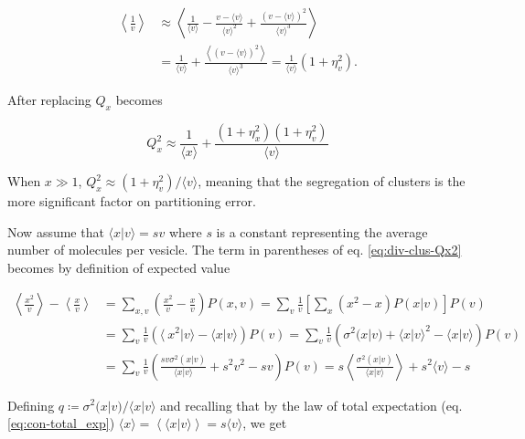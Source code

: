 \begin{equation*}
  \begin{split}
    \left\langle\frac{1}{v}\right\rangle &\approx \left\langle \frac{1}{\langle v\rangle} - \frac{v-\langle v\rangle}{\langle v\rangle^2} + \frac{(v-\langle v\rangle)^2}{\langle v\rangle^3}\right\rangle\\
    &=\frac{1}{\langle v\rangle} + \frac{\left\langle(v-\langle v\rangle)^2\right\rangle}{\langle v\rangle^3} = \frac{1}{\langle v\rangle}\left(1+\eta_v^2\right).
  \end{split}
\end{equation*}

After replacing $Q_x$ becomes

\begin{equation*}
  \boxed{Q_x^2 \approx \frac{1}{\langle x\rangle} + \frac{(1+\eta_x^2)(1+\eta_v^2)}{\langle v\rangle}}
\end{equation*}

When $x\gg 1$, $Q_x^2\approx(1+\eta_v^2)/\langle v\rangle$, meaning that the segregation of clusters is the more significant factor on partitioning error.

Now assume that $\langle x|v\rangle = sv$ where $s$ is a constant representing the average number of molecules per vesicle. The term in parentheses of eq. \eqref{eq:div-clus-Qx2} becomes by definition of expected value

\begin{equation}
  \begin{split}
    \left\langle \frac{x^2}{v}\right\rangle-\left\langle \frac{x}{v}\right\rangle &= \sum_{x,v}\left( \frac{x^2}{v}- \frac{x}{v}\right)P(x,v) = \sum_v\frac{1}{v}\left[\sum_x\left(x^2- x\right)P(x|v)\right]P(v)\\
    &=\sum_v\frac{1}{v}\left(\langle\ x^2|v\rangle - \langle x|v\rangle\right)P(v)=\sum_v\frac{1}{v}\left(\sigma^2(x|v) + \langle x|v\rangle^2-\langle x|v\rangle\right)P(v)\\
    &=\sum_v\frac{1}{v}\left(\frac{sv\sigma^2(x|v)}{\langle x|v\rangle} + s^2v^2-sv\right)P(v) = s\left\langle\frac{\sigma^2(x|v)}{\langle x|v\rangle}\right\rangle + s^2\langle v\rangle - s
  \end{split}
\end{equation}

Defining $q\coloneqq\sigma^2(x|v)/\langle x|v\rangle$ and recalling that by the law of total expectation (eq. \eqref{eq:con-total_exp})  $\langle x\rangle = \left\langle\langle x|v\rangle\right\rangle = s\langle v\rangle$, we get

